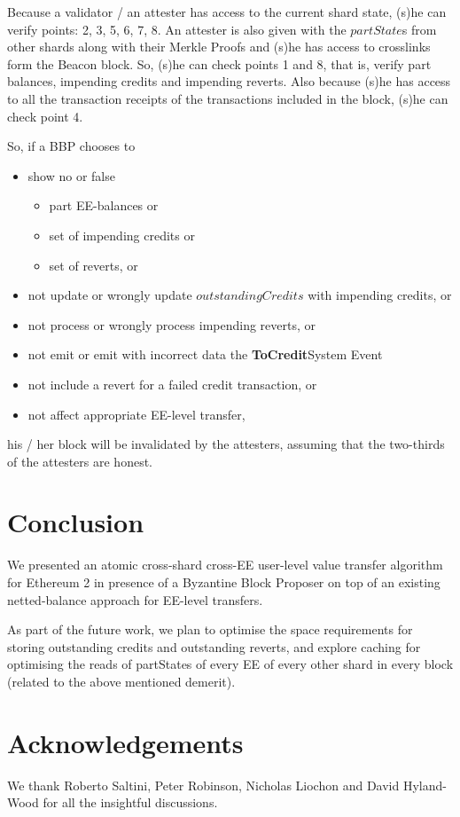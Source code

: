 \documentclass{article}
\newcommand{\tocredit}[0]{{\bf ToCredit}}
\begin{document}
Because a validator / an attester has access to the current shard state, (s)he can verify points: 2, 3, 5, 6, 7, 8. An attester is also given with the $partState$s from other shards along with their Merkle Proofs and (s)he has access to crosslinks form the Beacon block. So, (s)he can check points 1 and 8, that is, verify part balances, impending credits and impending reverts. Also because (s)he has access to all the transaction receipts of the transactions included in the block, (s)he can check point 4.

So, if a BBP chooses to

\begin{itemize}
	\item show no or false 
	\begin{itemize}
		\item part EE-balances or
		\item set of impending credits or
		\item set of reverts, or
	\end{itemize}
	\item not update or wrongly update $outstandingCredits$ with impending credits, or
	\item not process or wrongly process impending reverts, or
	\item not emit or emit with incorrect data the \tocredit System Event
	\item not include a revert for a failed credit transaction, or
	\item not affect appropriate EE-level transfer,
\end{itemize}
his / her block will be invalidated by the attesters, assuming that the two-thirds of the attesters are honest.

\section{Conclusion}
We presented an atomic cross-shard cross-EE user-level value transfer algorithm for Ethereum 2 in presence of a Byzantine Block Proposer on top of an existing netted-balance approach for EE-level transfers. 

As part of the future work, we plan to optimise the space requirements for storing outstanding credits and outstanding reverts, and explore caching for optimising the reads of partStates of every EE of every other shard in every block (related to the above mentioned demerit).

\section*{Acknowledgements}
We thank Roberto Saltini, Peter Robinson, Nicholas Liochon and David Hyland-Wood for all the insightful discussions.



\end{document}
